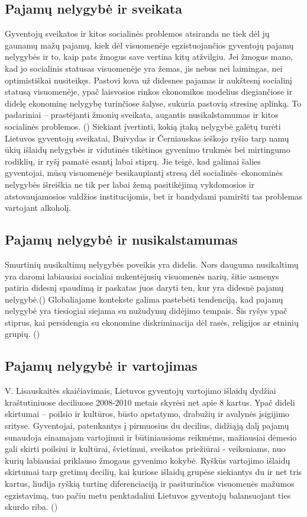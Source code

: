 \documentclass[12pt,a4paper,titlepage]{article}
\begin{document}
\subsection{Pajamų nelygybė ir sveikata}
Gyventojų sveikatos ir kitos socialinės problemos atsiranda ne tiek dėl jų gaunamų mažų pajamų, kiek dėl visuomenėje egzistuojančios gyventojų pajamų nelygybės ir to, kaip pats žmogus save vertina kitų atžvilgiu. Jei žmogus mano, kad jo socialinis statusas visuomenėje yra žemas, jis nebus nei laimingas, nei optimistiškai
nusiteikęs. Pastovi kova už didesnes pajamas ir aukštesnį socialinį statusą visuomenėje, ypač laisvosios rinkos ekonomikos modelius diegiančiose ir didelę ekonominę nelygybę turinčiose šalyse, sukuria pastovią stresinę aplinką. To padariniai – prastėjanti žmonių sveikata, augantis nusikalstamumas ir kitos socialinės problemos. (\cite{buivydas2011ar})
Siekiant įvertinti, kokią įtaką nelygybė galėtų turėti Lietuvos gyventojų sveikatai, Buivydas ir Černiauskas ieškojo ryšio tarp namų ūkių išlaidų nelygybės ir vidutinės tikėtinos gyvenimo trukmės bei mirtingumo rodiklių, ir ryšį pamatė esantį labai stiprų. Jie teigė, kad galimai šalies gyventojai, mūsų visuomenėje besikaupiantį stresą dėl socialinės–ekonominės nelygybės išreiškia ne tik per labai žemą pasitikėjimą vykdomosios ir atstovaujamosios valdžios
institucijomis, bet ir bandydami pamiršti tas problemas vartojant alkoholį.
\subsection{Pajamų nelygybė ir nusikalstamumas}
Smurtinių nusikaltimų nelygybės poveikis yra didelis. Nors dauguma nusikaltimų yra daromi labiausiai socialiai nukentėjusių visuomenės narių, šitie asmenys patiria didesnį spaudimą ir paskatas juos daryti ten, kur yra didesnė pajamų nelygybė.(\cite{kelly2000inequality}) Globaliajame kontekste galima pastebėti tendenciją, kad pajamų
nelygybė yra tiesiogiai siejama su nužudymų didėjimo tempais. Šis ryšys ypač stiprus, kai persidengia su ekonomine diskriminacija dėl rasės, religijos ar etninių grupių. (\cite{skuvciene2008pajamku})
\subsection{Pajamų nelygybė ir vartojimas}
V. Lisauskaitės skaičiavimais, Lietuvos gyventojų vartojimo
išlaidų dydžiai kraštutiniuose deciliuose 2008-2010 metais
skyrėsi net apie 8 kartus. Ypač dideli skirtumai – poilsio ir kultūros, būsto apstatymo, drabužių ir avalynės įsigijimo srityse.
Gyventojai, patenkantys į pirmuosius du decilius, didžiąją
dalį pajamų sunaudoja einamajam vartojimui ir būtiniausioms reikmėms, mažiausiai dėmesio gali skirti poilsiui ir
kultūrai, švietimui, sveikatos priežiūrai - veiksniams, nuo
kurių labiausiai priklauso žmogaus gyvenimo kokybė. Ryškūs vartojimo išlaidų skirtumai tarp gretimų decilių, kai kuriose išlaidų grupėse siekiantys du ir net tris kartus, liudija ryškią turtinę diferenciaciją ir pasiturinčios visuomenės mažumos egzistavimą, tuo pačiu metu penktadaliui Lietuvos gyventojų balansuojant ties skurdo riba. (\cite{lisauskaite2010lietuvos})
\end{document}

